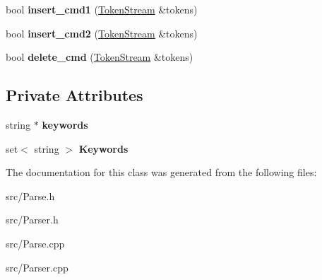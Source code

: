 \begin{DoxyCompactItemize}
\item 
\hypertarget{class_parser_a1724f6543438950d37b868fd8f78f337}{bool {\bfseries insert\-\_\-cmd1} (\hyperlink{class_token_stream}{Token\-Stream} \&tokens)}\label{class_parser_a1724f6543438950d37b868fd8f78f337}

\item 
\hypertarget{class_parser_ad6c1e60d15b7c4af573fa36c86417793}{bool {\bfseries insert\-\_\-cmd2} (\hyperlink{class_token_stream}{Token\-Stream} \&tokens)}\label{class_parser_ad6c1e60d15b7c4af573fa36c86417793}

\item 
\hypertarget{class_parser_a7216e601459e66e825d8814f3f31523d}{bool {\bfseries delete\-\_\-cmd} (\hyperlink{class_token_stream}{Token\-Stream} \&tokens)}\label{class_parser_a7216e601459e66e825d8814f3f31523d}

\end{DoxyCompactItemize}
\subsection*{Private Attributes}
\begin{DoxyCompactItemize}
\item 
\hypertarget{class_parser_a0874c2c35133d7b6e37ce72bdd0a5c75}{string $\ast$ {\bfseries keywords}}\label{class_parser_a0874c2c35133d7b6e37ce72bdd0a5c75}

\item 
\hypertarget{class_parser_ae03be083811a7044a3f94e65afbc8c56}{set$<$ string $>$ {\bfseries Keywords}}\label{class_parser_ae03be083811a7044a3f94e65afbc8c56}

\end{DoxyCompactItemize}


The documentation for this class was generated from the following files\-:\begin{DoxyCompactItemize}
\item 
src/Parse.\-h\item 
src/Parser.\-h\item 
src/Parse.\-cpp\item 
src/Parser.\-cpp\end{DoxyCompactItemize}
